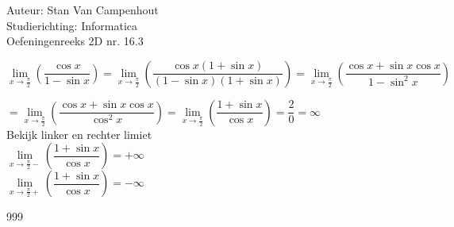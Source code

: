 \documentclass[a4paper]{article}
\begin{document}
  
\noindent \large Auteur: Stan Van Campenhout \\
\noindent \large Studierichting:  Informatica\\
\noindent \large Oefeningenreeks 2D nr. 16.3\\

\medskip

\normalsize

$ \lim\limits_{x \rightarrow \tfrac{\pi}{2}} \left(\dfrac{\cos x}{1 - \sin x} \right)
= \lim\limits_{x \rightarrow \tfrac{\pi}{2}} \left(\dfrac{\cos x ( 1 + \sin x)}{(1 - \sin x)(1 + \sin x)} \right) 
= \lim\limits_{x \rightarrow \tfrac{\pi}{2}} \left(\dfrac{\cos x + \sin x \cos x}{1 - \sin^2 x} \right) $\\

\medskip


$ = \lim\limits_{x \rightarrow \tfrac{\pi}{2}} \left(\dfrac{\cos x + \sin x \cos x}{\cos^2 x} \right)  
=  \lim\limits_{x \rightarrow \tfrac{\pi}{2}} \left(\dfrac{1 + \sin x}{\cos x} \right) = \dfrac{2}{0} = \infty $\\

Bekijk linker en rechter limiet \\

$ \lim\limits_{x \rightarrow \tfrac{\pi}{2}-} \left(\dfrac{1 + \sin x}{\cos x} \right) = +\infty $\\

$ \lim\limits_{x \rightarrow \tfrac{\pi}{2}+} \left(\dfrac{1 + \sin x}{\cos x} \right) = -\infty $\\

\begin{thebibliography}{999}
\end{thebibliography}
\end{document}

